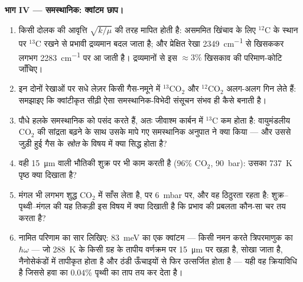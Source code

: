 \begin{problem}
\medskip\noindent\textbf{भाग IV --- समस्थानिक: क्वांटम
छाप।}
\begin{enumerate}[resume]
  \item किसी दोलक की आवृत्ति $\sqrt{k/\mu}$ की तरह मापित होती है:
        असममित खिंचाव के लिए $^{12}$C के स्थान पर $^{13}$C रखने से
        प्रभावी द्रव्यमान बदल जाता है; और प्रेक्षित रेखा
        \qty{2349}{cm^{-1}} से खिसककर लगभग \qty{2283}{cm^{-1}} पर आ
        जाती है। द्रव्यमानों से इस $\approx 3\%$ खिसकाव की
        परिमाण-कोटि जाँचिए।
  \item इन दोनों रेखाओं पर सधे लेज़र किसी गैस-नमूने में
        $^{13}$CO$_2$ और $^{12}$CO$_2$ अलग-अलग गिन लेते हैं: समझाइए
        कि क्वांटीकृत सीढ़ी ऐसा समस्थानिक-विभेदी संसूचन संभव ही कैसे
        बनाती है।
  \item पौधे हलके समस्थानिक को पसंद करते हैं, अतः जीवाश्म कार्बन में
        $^{13}$C कम होता है: वायुमंडलीय CO$_2$ की सांद्रता बढ़ने के
        साथ उसके मापे गए समस्थानिक अनुपात ने क्या किया --- और उससे
        जुड़ी हुई गैस के \emph{स्रोत} के विषय में क्या सिद्ध होता है?
  \item वही \qty{15}{\micro m} वाली भौतिकी शुक्र पर भी काम करती है
        ($96\%$ CO$_2$, \qty{90}{bar}): उसका
        \qty{737}{K} पृष्ठ क्या दिखाता है?
  \item मंगल भी लगभग शुद्ध CO$_2$ में साँस लेता है, पर \qty{6}{mbar}
        पर, और वह ठिठुरता रहता है: शुक्र--पृथ्वी--मंगल की यह तिकड़ी
        इस विषय में क्या दिखाती है कि प्रभाव की प्रबलता कौन-सा चर तय
        करता है?
  \item नामित परिणाम का सार लिखिए: \qty{83}{meV} का एक क्वांटम ---
        किसी नमन करते त्रिपरमाणुक का $\hbar\omega$ --- जो
        \qty{288}{K} के किसी ग्रह के तापीय वर्णक्रम पर
        \qty{15}{\micro m} पर खड़ा है, सोखा जाता है, नैनोसेकंडों में
        तापीकृत होता है और ठंडी ऊँचाइयों से फिर उत्सर्जित होता है ---
        यही वह क्रियाविधि है जिससे हवा का $0.04\%$ पृथ्वी का ताप तय
        कर देता है।
\end{enumerate}
\end{problem}
